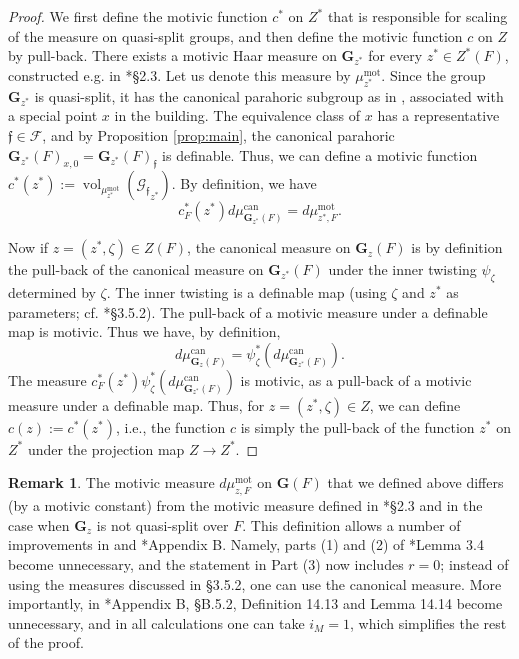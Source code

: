 \documentclass{amsart}
\newcommand{\cF}{\mathcal{F}}
\newcommand{\cG}{\mathcal{G}}
\DeclareMathOperator{\vol}{vol}
\newcommand{\bG}{\mathbf{G}}
\newcommand{\can}{\mathrm{can}}
\newcommand{\ff}{{\mathfrak f}}
\newcommand\mot{\mathrm{mot}}
\theoremstyle{plain}
\theoremstyle{definition}
\newtheorem{rem}[thm]{Remark}
\begin{document}
\begin{proof} 
We first define the motivic function $c^\ast$ on $Z^\ast$ that is responsible for scaling of the measure on quasi-split groups, and then define the motivic function $c$ on $Z$ by pull-back. 
There exists a motivic Haar measure on $\bG_{z^\ast}$ for every $z^\ast\in Z^\ast(F)$,
constructed e.g. in \cite{gordon-hales:15a}*{\S 2.3}. Let us denote this measure by $\mu_{z^\ast}^\mot$. 
Since the group $\bG_{z^\ast}$ is quasi-split,   
it has the canonical parahoric subgroup as in \cite{gross:97a}, associated with a special point $x$ in the building. The equivalence class of $x$ has a representative $\ff\in \cF$, and by Proposition \ref{prop:main}, the canonical parahoric 
$\bG_{z^\ast}(F)_{x, 0}=\bG_{z^\ast}(F)_\ff$ is definable.  Thus, we can define  a motivic function $c^\ast(z^\ast):=
\vol_{\mu_{z^\ast}^\mot}({\cG_{\ff}}_{z^\ast})$. 
By definition, we have 
\[
c^\ast_F(z^\ast) d\mu_{\bG_{z^\ast}(F)}^\can = d\mu_{z^\ast, F}^\mot.
\]

Now if $z=(z^\ast, \zeta)\in Z(F)$, the canonical measure on $\bG_z(F)$ is by definition the pull-back of the canonical measure on $\bG_{z^\ast}(F)$ under the inner twisting $\psi_{\zeta}$ determined by $\zeta$. 
The inner twisting is a definable map
(using $\zeta$ and $z^\ast$ as parameters; cf. \cite{cluckers-gordon-halupczok:14b}*{\S 3.5.2}). 
The pull-back of a motivic measure under a definable map is motivic.
Thus we have, by definition, 
$$ %
d\mu_{\bG_{z}(F)}^\can  =  
\psi_{\zeta}^\ast \left(d\mu_{\bG_{z^\ast}(F)}^\can \right).$$ 
The measure $c^\ast_F(z^\ast)\psi_{\zeta}^\ast \left(d\mu_{\bG_{z^\ast}(F)}^\can \right)$ is motivic, as a pull-back of a motivic measure under a definable map. 
Thus, for $z=(z^\ast, \zeta)\in Z$, we can define $c(z):= c^\ast(z^\ast)$, i.e., 
the function $c$ is simply the pull-back of the function $z^\ast$ on $Z^\ast$ under the projection map $Z\to Z^\ast$. 
\end{proof}

\begin{rem} The motivic measure $d\mu_{z, F}^\mot$ on $\bG(F)$ that we defined above differs (by a motivic constant) from the 
motivic measure defined in \cite{gordon-hales:15a}*{\S 2.3} and  \cite{cluckers-gordon-halupczok:14b} in the case when $\bG_z$ is not quasi-split over $F$. 
This definition allows a number of improvements in \cite{cluckers-gordon-halupczok:14b} and 
\cite{shin-templier:15a}*{Appendix B}. 
Namely,  parts (1) and (2) of \cite{cluckers-gordon-halupczok:14b}*{Lemma 3.4} become unnecessary, and the statement in Part (3)
now includes $r=0$; instead of using the measures discussed in \S 3.5.2, one can use the canonical measure. 
More importantly, in \cite{shin-templier:15a}*{Appendix B, \S B.5.2}, Definition 14.13 and Lemma 14.14
become unnecessary, and in all calculations one can take $i_M=1$, which simplifies the rest of the proof.
\end{rem}
\end{document}
